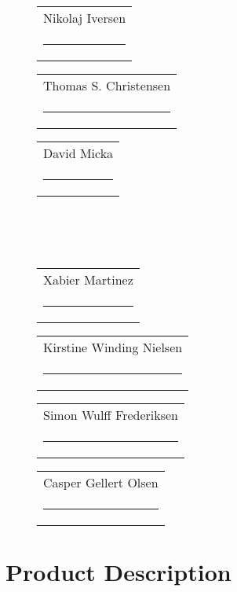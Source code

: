 



\setlength{\parindent}{0pt}
\setlength{\parskip}{0.7\baselineskip}%
\thispagestyle{empty}

\clearpage
\fancyfoot{}
\fancyfoot[CO,CE]{\thepage}


% 


\pagestyle{fancy}
\fancyfoot{}
\setcounter{page}{1}
\fancyfoot[LO,RE]{\thepage}



\begin{figure}
\newcommand{\namesigdate}[2][5cm]{%
  \begin{tabular}{@{}p{#1}@{}}
    #2 \\[2\normalbaselineskip] \hrule \\[0pt]
  \end{tabular}
}
\begin{changemargin}{-0cm}{-0cm}
\centering
\noindent \namesigdate[4.3cm]{Nikolaj Iversen} \hspace{1cm} \namesigdate[4.3cm]{Thomas S. Christensen} \hspace{1cm} \namesigdate[4.3cm]{David Micka} \\~\\~\\
\centering
\noindent \namesigdate[4.3cm]{Xabier Martinez} \hspace{1cm}  \namesigdate[4.3cm]{Kirstine Winding Nielsen} \hspace{1cm}   \namesigdate[4.3cm]{Simon Wulff Frederiksen}
\hfill \namesigdate[4.3cm]{Casper Gellert Olsen} \hfill 
\end{changemargin}
\end{figure}

\clearpage






\section{Product Description}\label{product_description}



\clearpage

